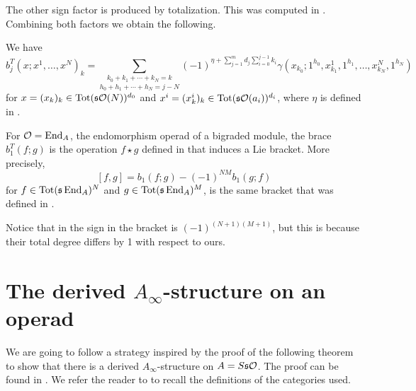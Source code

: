 \documentclass[Thesis.tex]{subfiles}
\begin{document}
The other sign factor is produced by totalization. This was computed in . Combining both factors we obtain the following.

\begin{lem}
We have 
\begin{equation}\label{bracetot}
b_j^T(x;x^1,\dots, x^N)_k=\underset{h_0+h_1+\cdots+h_N=j-N}{\sum_{k_0+k_1+\cdots+k_N=k}}(-1)^{\eta+\sum_{j=1}^m d_j\sum_{i=0}^{j-1}k_i}\gamma(x_{k_0};1^{h_0},x^1_{k_1},1^{h_1},\dots, x^N_{k_N},1^{h_N})
\end{equation}
for $x=(x_k)_k\in\operatorname{Tot}(\mathfrak{s}{\mathcal O}(N))^{d_0}$ and $x^i=(x^i_k)_k\in\operatorname{Tot}(\mathfrak{s}{\mathcal O}(a_i))^{d_i}$, where $\eta$ is defined in . 
\end{lem}

\begin{corollary}\label{biliebracket}
 For ${\mathcal O} = \operatorname{End}_A$, the endomorphism operad of a bigraded module, the brace $b_1^T(f;g)$ is the operation $f\star g$ defined in \cite{LRW} that induces a Lie bracket. More precisely,
\[
[f,g]=b_1(f;g)-(-1)^{NM}b_1(g;f)
\]
for $f\in\operatorname{Tot}(\mathfrak{s}\operatorname{End}_A)^N$ and $g\in\operatorname{Tot}(\mathfrak{s}\operatorname{End}_A)^M$, is the same bracket that was defined in \cite{LRW}. 
\end{corollary}

Notice that in \cite{LRW} the sign in the bracket is $(-1)^{(N+1)(M+1)}$, but this is because their total degree differs by 1 with respect to ours.

\section{The derived $A_\infty$-structure on an operad}\label{derivedstructure}




We are going to follow a strategy inspired by the proof of the following theorem to show that there is a derived $A_\infty$-structure on $A=S\mathfrak{s}{\mathcal O}$. The proof can be found in \cite[Poposition 4.55]{whitehouse}. We refer the reader to  to recall the definitions of the categories used. %
\end{document}
